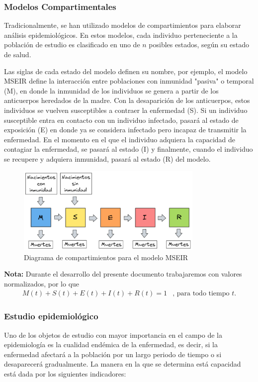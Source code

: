 \documentclass{article}
\begin{document}
\subsubsection{Modelos Compartimentales}

Tradicionalmente, se han utilizado modelos de compartimientos para elaborar análisis epidemiológicos. En estos modelos, cada individuo perteneciente a la población de estudio es clasificado en uno de $n$ posibles estados, según su estado de salud.

Las siglas de cada estado del modelo definen su nombre, por ejemplo, el modelo MSEIR define la interacción entre poblaciones con inmunidad "pasiva" o temporal (M), en donde la inmunidad de los individuos se genera a partir de los anticuerpos heredados de la madre. Con la desaparición de los anticuerpos, estos individuos se vuelven susceptibles a contraer la enfermedad (S). Si un individuo susceptible entra en contacto con un individuo infectado, pasará al estado de exposición (E) en donde ya se considera infectado pero incapaz de transmitir la enfermedad. En el momento en el que el individuo adquiera la capacidad de contagiar la enfermedad, se pasará al estado (I) y finalmente, cuando el individuo se recupere y adquiera inmunidad, pasará al estado (R) del modelo.\cite{modelCompartimental}

\begin{figure}[h.]
  \centering
    \includegraphics[width=0.8\textwidth]{Imagenes/MSEIR_compatimientos.PNG}
  \caption{Diagrama de compartimientos para el modelo MSEIR}
  \label{fig:ejemplo}
\end{figure}

\textbf{Nota:} Durante el desarrollo del presente documento trabajaremos con valores normalizados, por lo que 
$$\begin{array}{cc}
    M(t) + S(t) + E(t) + I(t) + R(t) = 1 & \text{, para todo tiempo }t.
\end{array} $$

\subsubsection{Estudio epidemiológico}
Uno de los objetos de estudio con mayor importancia en el campo de la epidemiología es la cualidad endémica de la enfermedad, es decir, si la enfermedad afectará a la población por un largo periodo de tiempo o si desaparecerá gradualmente. La manera en la que se determina está capacidad está dada por los siguientes indicadores:
\end{document}
